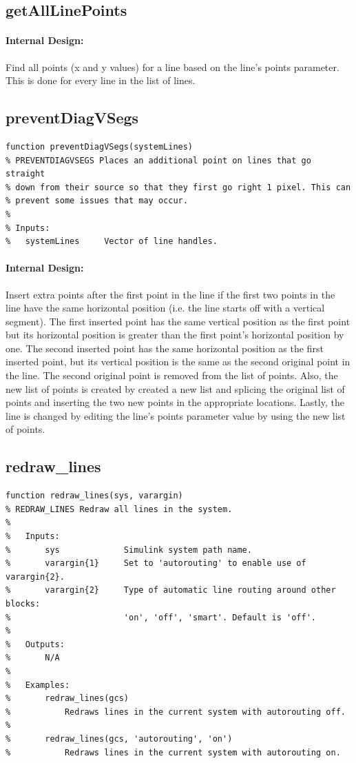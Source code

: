 \documentclass[12pt,letterpaper]{report}
\begin{document}
\subsection{getAllLinePoints}
\paragraph{Internal Design:} Find all points (x and y values) for a line based on the line's points parameter. This is done for every line in the list of lines.

\subsection{preventDiagVSegs}
\begin{lstlisting}
function preventDiagVSegs(systemLines)
% PREVENTDIAGVSEGS Places an additional point on lines that go straight
% down from their source so that they first go right 1 pixel. This can
% prevent some issues that may occur.
%
% Inputs:
%   systemLines     Vector of line handles.
\end{lstlisting}
\paragraph{Internal Design:} Insert extra points after the first point in the line if the first two points in the line have the same horizontal position (i.e. the line starts off with a vertical segment). The first inserted point has the same vertical position as the first point but its horizontal position is greater than the first point's horizontal position by one. The second inserted point has the same horizontal position as the first inserted point, but its vertical position is the same as the second original point in the line. The second original point is removed from the list of points. Also, the new list of points is created by created a new list and splicing the original list of points and inserting the two new points in the appropriate locations. Lastly, the line is changed by editing the line's points parameter value by using the new list of points.

\subsection{redraw\_lines} \label{redraw_lines}
\begin{lstlisting}
function redraw_lines(sys, varargin)
% REDRAW_LINES Redraw all lines in the system.
%
%   Inputs:
%       sys             Simulink system path name.
%       varargin{1}     Set to 'autorouting' to enable use of varargin{2}.
%       varargin{2}     Type of automatic line routing around other blocks:
%                       'on', 'off', 'smart'. Default is 'off'.
%
%   Outputs:
%       N/A
%
%   Examples:
%       redraw_lines(gcs)
%           Redraws lines in the current system with autorouting off.
%
%       redraw_lines(gcs, 'autorouting', 'on')
%           Redraws lines in the current system with autorouting on.
\end{lstlisting}
\end{document}
